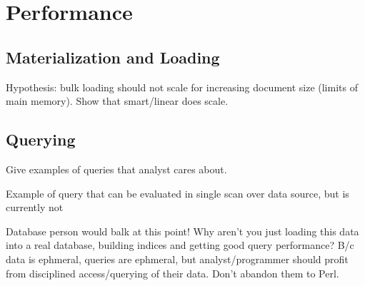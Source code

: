 \section{Performance}
\label{section:performance}

\subsection{Materialization and Loading}

Hypothesis: bulk loading should not scale for increasing document size
(limits of main memory).  Show that smart/linear does scale.

\subsection{Querying}

Give examples of queries that analyst cares about. 

Example of query that can be evaluated in single scan over data
source, but is currently not 

Database person would balk at this point!  Why aren't you just loading
this data into a real database, building indices and getting good
query performance?  B/c data is ephmeral, queries are ephmeral, but
analyst/programmer should profit from disciplined access/querying of
their data.  Don't abandon them to Perl. 

